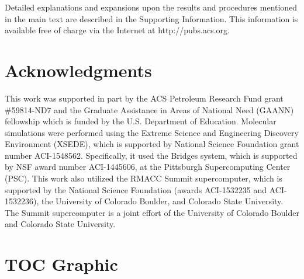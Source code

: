\documentclass{article}
\begin{document}
  Detailed explanations and expansions upon the results and procedures mentioned in
  the main text are described in the Supporting Information. This information is
  available free of charge via the Internet at http://pubs.acs.org.

  \section*{Acknowledgments}
  This work was supported in part by the ACS Petroleum Research Fund grant \#59814-ND7
  and the Graduate Assistance in Areas of National Need (GAANN)
  fellowship which is funded by the U.S. Department of Education.
  Molecular simulations were performed using the Extreme Science and
  Engineering Discovery Environment (XSEDE), which is supported by National
  Science Foundation grant number ACI-1548562. Specifically, it used the Bridges
  system, which is supported by NSF award number ACI-1445606, at the Pittsburgh
  Supercomputing Center (PSC). This work also utilized the RMACC Summit supercomputer,
  which is supported by the National Science Foundation (awards ACI-1532235 and
  ACI-1532236), the University of Colorado Boulder, and Colorado State
  University. The Summit supercomputer is a joint effort of the University of
  Colorado Boulder and Colorado State University.

  \clearpage

  
  

  \newpage

  \section*{TOC Graphic}
\end{document}
